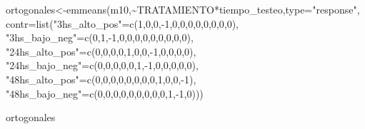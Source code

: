 \documentclass[
]{article}
\newenvironment{Shaded}{\begin{snugshade}}{\end{snugshade}}
\newcommand{\AttributeTok}[1]{\textcolor[rgb]{0.77,0.63,0.00}{#1}}
\newcommand{\DecValTok}[1]{\textcolor[rgb]{0.00,0.00,0.81}{#1}}
\newcommand{\FunctionTok}[1]{\textcolor[rgb]{0.00,0.00,0.00}{#1}}
\newcommand{\NormalTok}[1]{#1}
\newcommand{\OtherTok}[1]{\textcolor[rgb]{0.56,0.35,0.01}{#1}}
\newcommand{\SpecialCharTok}[1]{\textcolor[rgb]{0.00,0.00,0.00}{#1}}
\newcommand{\StringTok}[1]{\textcolor[rgb]{0.31,0.60,0.02}{#1}}
\begin{document}
\begin{Shaded}
\begin{Highlighting}[]
\NormalTok{ortogonales}\OtherTok{\textless{}{-}}\FunctionTok{emmeans}\NormalTok{(m10,}\SpecialCharTok{\textasciitilde{}}\NormalTok{TRATAMIENTO}\SpecialCharTok{*}\NormalTok{tiempo\_testeo,}\AttributeTok{type=}\StringTok{"response"}\NormalTok{,}
                \AttributeTok{contr=}\FunctionTok{list}\NormalTok{(}\StringTok{"3hs\_alto\_pos"}\OtherTok{=}\FunctionTok{c}\NormalTok{(}\DecValTok{1}\NormalTok{,}\DecValTok{0}\NormalTok{,}\DecValTok{0}\NormalTok{,}\SpecialCharTok{{-}}\DecValTok{1}\NormalTok{,}\DecValTok{0}\NormalTok{,}\DecValTok{0}\NormalTok{,}\DecValTok{0}\NormalTok{,}\DecValTok{0}\NormalTok{,}\DecValTok{0}\NormalTok{,}\DecValTok{0}\NormalTok{,}\DecValTok{0}\NormalTok{,}\DecValTok{0}\NormalTok{), }
                     \StringTok{"3hs\_bajo\_neg"}\OtherTok{=}\FunctionTok{c}\NormalTok{(}\DecValTok{0}\NormalTok{,}\DecValTok{1}\NormalTok{,}\SpecialCharTok{{-}}\DecValTok{1}\NormalTok{,}\DecValTok{0}\NormalTok{,}\DecValTok{0}\NormalTok{,}\DecValTok{0}\NormalTok{,}\DecValTok{0}\NormalTok{,}\DecValTok{0}\NormalTok{,}\DecValTok{0}\NormalTok{,}\DecValTok{0}\NormalTok{,}\DecValTok{0}\NormalTok{,}\DecValTok{0}\NormalTok{), }
                     \StringTok{"24hs\_alto\_pos"}\OtherTok{=}\FunctionTok{c}\NormalTok{(}\DecValTok{0}\NormalTok{,}\DecValTok{0}\NormalTok{,}\DecValTok{0}\NormalTok{,}\DecValTok{0}\NormalTok{,}\DecValTok{1}\NormalTok{,}\DecValTok{0}\NormalTok{,}\DecValTok{0}\NormalTok{,}\SpecialCharTok{{-}}\DecValTok{1}\NormalTok{,}\DecValTok{0}\NormalTok{,}\DecValTok{0}\NormalTok{,}\DecValTok{0}\NormalTok{,}\DecValTok{0}\NormalTok{), }
                     \StringTok{"24hs\_bajo\_neg"}\OtherTok{=}\FunctionTok{c}\NormalTok{(}\DecValTok{0}\NormalTok{,}\DecValTok{0}\NormalTok{,}\DecValTok{0}\NormalTok{,}\DecValTok{0}\NormalTok{,}\DecValTok{0}\NormalTok{,}\DecValTok{1}\NormalTok{,}\SpecialCharTok{{-}}\DecValTok{1}\NormalTok{,}\DecValTok{0}\NormalTok{,}\DecValTok{0}\NormalTok{,}\DecValTok{0}\NormalTok{,}\DecValTok{0}\NormalTok{,}\DecValTok{0}\NormalTok{), }
                     \StringTok{"48hs\_alto\_pos"}\OtherTok{=}\FunctionTok{c}\NormalTok{(}\DecValTok{0}\NormalTok{,}\DecValTok{0}\NormalTok{,}\DecValTok{0}\NormalTok{,}\DecValTok{0}\NormalTok{,}\DecValTok{0}\NormalTok{,}\DecValTok{0}\NormalTok{,}\DecValTok{0}\NormalTok{,}\DecValTok{0}\NormalTok{,}\DecValTok{1}\NormalTok{,}\DecValTok{0}\NormalTok{,}\DecValTok{0}\NormalTok{,}\SpecialCharTok{{-}}\DecValTok{1}\NormalTok{), }
                     \StringTok{"48hs\_bajo\_neg"}\OtherTok{=}\FunctionTok{c}\NormalTok{(}\DecValTok{0}\NormalTok{,}\DecValTok{0}\NormalTok{,}\DecValTok{0}\NormalTok{,}\DecValTok{0}\NormalTok{,}\DecValTok{0}\NormalTok{,}\DecValTok{0}\NormalTok{,}\DecValTok{0}\NormalTok{,}\DecValTok{0}\NormalTok{,}\DecValTok{0}\NormalTok{,}\DecValTok{1}\NormalTok{,}\SpecialCharTok{{-}}\DecValTok{1}\NormalTok{,}\DecValTok{0}\NormalTok{)))}

\NormalTok{ortogonales }
\end{Highlighting}
\end{Shaded}
\end{document}
